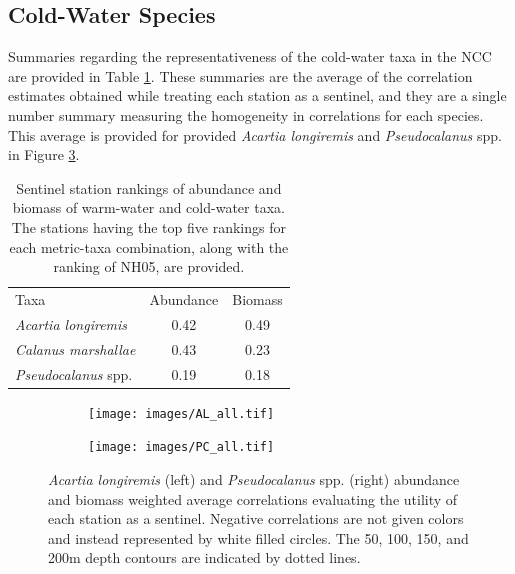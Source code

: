 \documentclass[preprint, authoryear, 12pt]{elsarticle}
\begin{document}
\renewcommand{\thesubsection}{C.2}

\clearpage
\subsection{Cold-Water Species}

Summaries regarding the representativeness of the cold-water taxa in the NCC are provided in Table \ref{tab:cold_all}. These summaries are the average of the correlation estimates obtained while treating each station as a sentinel, and they are a single number summary measuring the homogeneity in correlations for each species. This average is provided for provided \textit{Acartia longiremis} and \textit{Pseudocalanus} spp. in Figure \ref{fig:AL_PC_all}. 

\begin{table}[ht]
    \footnotesize
    \centering
    \begin{tabular}{lcc}
    \hline
    \hline
           Taxa & Abundance & Biomass \\
           \textit{Acartia longiremis} & 0.42 & 0.49 \\
           \textit{Calanus marshallae} & 0.43 & 0.23 \\
           \textit{Pseudocalanus} spp. & 0.19 & 0.18 \\
         \hline
    \end{tabular}
     \caption{Sentinel station rankings of abundance and biomass of warm-water and cold-water taxa. The stations having the top five rankings for each metric-taxa combination, along with the ranking of NH05, are provided.}
    \label{tab:cold_all}
\end{table}

\begin{figure}[ht]
\centering
\begin{subfigure}{0.45\textwidth}
  \centering
  \texttt{[image: images/AL\_all.tif]}
  \caption{}
  \label{fig:AL_all}
\end{subfigure}
\begin{subfigure}{0.45\textwidth}
  \centering
  \texttt{[image: images/PC\_all.tif]}
  \caption{}
  \label{fig:PC_all}
\end{subfigure} 
\caption{\textit{Acartia longiremis} (left) and \textit{Pseudocalanus} spp. (right) abundance and biomass weighted average correlations evaluating the utility of each station as a sentinel.  Negative correlations are not given colors and instead represented by white filled circles.  The 50, 100, 150, and 200m depth contours are indicated by dotted lines.}
\label{fig:AL_PC_all}
\end{figure}
\end{document}
